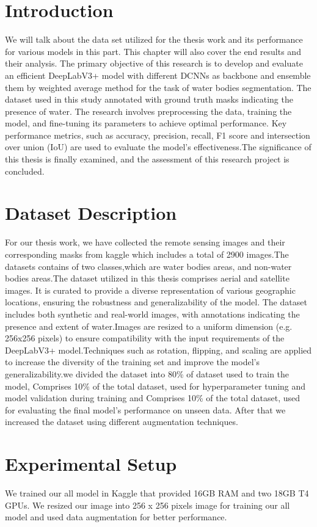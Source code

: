 \section{Introduction}
We will talk about the data set utilized for the thesis work and its performance for various models in this part. This chapter will also cover the end results and their analysis. 
The primary objective of this research is to develop and evaluate an efficient DeepLabV3+ model with different DCNNs as backbone and ensemble them by weighted average method for the task of water bodies segmentation. The dataset used in this study annotated with ground truth masks indicating the presence of water. The research involves preprocessing the data, training the model, and fine-tuning its parameters to achieve optimal performance. Key performance metrics, such as accuracy, precision, recall, F1 score and intersection over union (IoU) are used to evaluate the model's effectiveness.The significance of this thesis is finally examined, and the assessment of this research project is concluded.

\section{Dataset Description}
For our thesis work, we have collected the remote sensing images and their corresponding masks from kaggle \cite{data1} \cite{data2} which includes a total of 2900 images.The datasets contains of two classes,which are water bodies areas, and non-water bodies areas.The dataset utilized in this thesis comprises aerial and satellite images. It is curated to provide a diverse representation of various geographic locations, ensuring the robustness and generalizability of the model. The dataset includes both synthetic and real-world images, with annotations indicating the presence and extent of water.Images are resized to a uniform dimension (e.g. 256x256 pixels) to ensure compatibility with the input requirements of the DeepLabV3+ model.Techniques such as rotation, flipping, and scaling are applied to increase the diversity of the training set and improve the model's generalizability.we divided the dataset into
80\% of dataset used to train the model, Comprises 10\% of the total dataset, used for hyperparameter tuning and model validation during training and Comprises 10\% of the total dataset, used for evaluating the final model's performance on unseen data. After that we increased
the dataset using different augmentation techniques.

\section{Experimental Setup}
We trained our all model in Kaggle that provided 16GB RAM and two 18GB T4 GPUs. We resized
our image into 256 x 256 pixels image for training our all model and used data augmentation for better performance.

